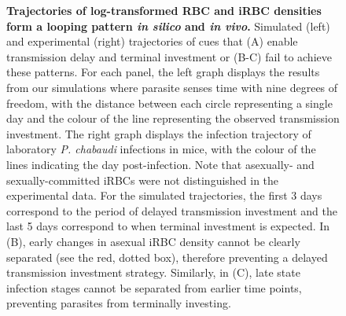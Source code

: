 \documentclass[10pt,letterpaper]{article}
\begin{document}
\begin{figure}[!h]
\caption{{\bf Trajectories of log-transformed RBC and iRBC densities form a looping pattern \emph{in silico} and \emph{in vivo}.}
Simulated (left) and experimental (right) trajectories of cues that (A) enable transmission delay and terminal investment or (B-C) fail to achieve these patterns. For each panel, the left graph displays the results from our simulations where parasite senses time with nine degrees of freedom, with the distance between each circle representing a single day and the colour of the line representing the observed transmission investment. The right graph displays the infection trajectory of laboratory \emph{P. chabaudi} infections in mice, with the colour of the lines indicating the day post-infection. Note that asexually- and sexually-committed iRBCs were not distinguished in the experimental data. For the simulated trajectories, the first 3 days correspond to the period of delayed transmission investment and the last 5 days correspond to when terminal investment is expected. In (B), early changes in asexual iRBC density cannot be clearly separated (see the red, dotted box), therefore preventing a delayed transmission investment strategy. Similarly, in (C), late state infection stages cannot be separated from earlier time points, preventing parasites from terminally investing.
}
\label{fig4}
\end{figure}
\end{document}
